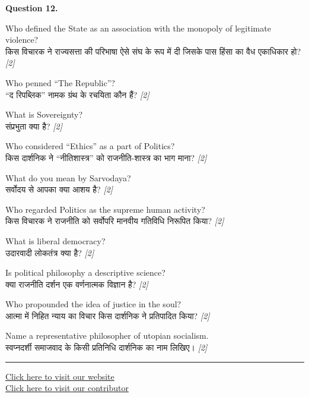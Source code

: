 \documentclass[11pt,a4paper]{article}
\newcommand{\pts}[1]{\hfill \textit{[#1]}}
\begin{document}
\noindent \textbf{Question 12.}
\begin{parts}
  \item Who defined the State as an association with the monopoly of legitimate violence?\\[1pt]
        किस विचारक ने राज्यसत्ता की परिभाषा ऐसे संघ के रूप में दी जिसके पास हिंसा का वैध एकाधिकार हो? \pts{2}

  \item Who penned ``The Republic''?\\[1pt]
        ``द रिपब्लिक'' नामक ग्रंथ के रचयिता कौन हैं? \pts{2}

  \item What is Sovereignty?\\[1pt]
        संप्रभुता क्या है? \pts{2}

  \item Who considered ``Ethics'' as a part of Politics?\\[1pt]
        किस दार्शनिक ने ``नीतिशास्त्र'' को राजनीति-शास्त्र का भाग माना? \pts{2}

  \item What do you mean by Sarvodaya?\\[1pt]
        सर्वोदय से आपका क्या आशय है? \pts{2}

  \item Who regarded Politics as the supreme human activity?\\[1pt]
        किस विचारक ने राजनीति को सर्वोपरि मानवीय गतिविधि निरूपित किया? \pts{2}

  \item What is liberal democracy?\\[1pt]
        उदारवादी लोकतंत्र क्या है? \pts{2}

  \item Is political philosophy a descriptive science?\\[1pt]
        क्या राजनीति दर्शन एक वर्णनात्मक विज्ञान है? \pts{2}

  \item Who propounded the idea of justice in the soul?\\[1pt]
        आत्मा में निहित न्याय का विचार किस दार्शनिक ने प्रतिपादित किया? \pts{2}

  \item Name a representative philosopher of utopian socialism.\\[1pt]
        स्वप्नदर्शी समाजवाद के किसी प्रतिनिधि दार्शनिक का नाम लिखिए। \pts{2}
\end{parts}

\vfill
\rule{\linewidth}{0.4pt}

\begin{center}\small
\href{https://bhu-exam.vercel.app/}{Click here to visit our website}\\[4pt]
\href{https://me-aryan.vercel.app/}{Click here to visit our contributor}
\end{center}
\end{document}
